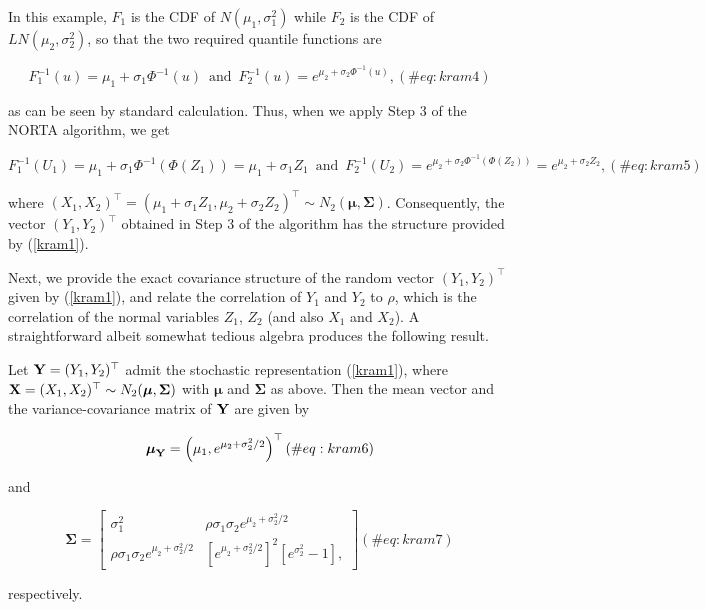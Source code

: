 \documentclass[
]{jss}
\begin{document}
In this example, \(F_1\) is the CDF of \(N(\mu_1, \sigma_1^2)\) while
\(F_2\) is the CDF of \(LN(\mu_2, \sigma_2^2)\), so that the two
required quantile functions are

\begin{equation}
F_1^{-1}(u) = \mu_1+\sigma_1 \Phi^{-1}(u)\,\,\, \mbox{and} \,\,\, F_2^{-1}(u) = e^{\mu_2+\sigma_2 \Phi^{-1}(u)}, 
(\#eq:kram4)
\end{equation}

as can be seen by standard calculation. Thus, when we apply Step 3 of
the NORTA algorithm, we get

\begin{equation}
F_1^{-1}(U_1) = \mu_1+\sigma_1 \Phi^{-1}(\Phi(Z_1)) =  \mu_1+\sigma_1 Z_1 \,\,\, \mbox{and} \,\,\, F_2^{-1}(U_2) = e^{\mu_2+\sigma_2 \Phi^{-1}(\Phi(Z_2))} = e^{\mu_2+\sigma_2 Z_2}, 
(\#eq:kram5)
\end{equation}

where
\((X_1, X_2)^\top = (\mu_1+\sigma_1 Z_1, \mu_2+\sigma_2 Z_2)^\top \sim N_2(\boldsymbol \mu, \boldsymbol \Sigma)\).
Consequently, the vector \((Y_1, Y_2)^\top\) obtained in Step 3 of the
algorithm has the structure provided by (\ref{kram1}).

\vspace{0.1in}

\noindent Next, we provide the exact covariance structure of the random
vector \((Y_1, Y_2)^\top\) given by (\ref{kram1}), and relate the
correlation of \(Y_1\) and \(Y_2\) to \(\rho\), which is the correlation
of the normal variables \(Z_1\), \(Z_2\) (and also \(X_1\) and \(X_2\)).
A straightforward albeit somewhat tedious algebra produces the following
result.

\begin{lemma}
Let ${\bf Y} = (Y_1, Y_2)^\top$ admit the stochastic representation (\ref{kram1}), where ${\bf X} = (X_1, X_2)^\top \sim N_2(\boldsymbol \mu, \boldsymbol \Sigma)$ with $\boldsymbol \mu$ and $\boldsymbol \Sigma$ as above. Then the mean vector and the variance-covariance matrix of ${\bf Y}$ are given by 

\begin{equation}
\boldsymbol \mu_{{\bf Y}} = \left(\mu_1, e^{\mu_2+\sigma_2^2/2}\right)^\top
(\#eq:kram6)
\end{equation}

and 

\begin{equation}
\boldsymbol \Sigma = 
\begin{bmatrix}
\sigma_1^2 & \rho \sigma_1\sigma_2  e^{\mu_2+\sigma_2^2/2}  \\
\rho \sigma_1\sigma_2 e^{\mu_2+\sigma_2^2/2} & \left[ e^{\mu_2+\sigma_2^2/2}\right]^2 \left[e^{\sigma_2^2} -1 \right],
\end{bmatrix}
(\#eq:kram7)
\end{equation}

respectively. 
\end{lemma}
\end{document}
